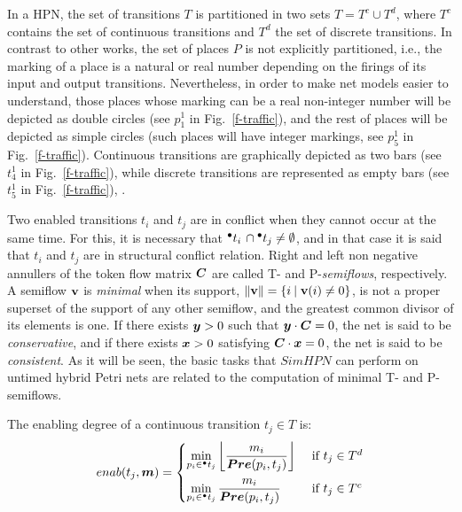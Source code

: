 In a HPN, the set of transitions $T$ is partitioned in two sets $T=T^c\cup T^d$,
where $T^c$ contains the set of continuous transitions and $T^d$ the set of discrete
transitions. In contrast to other works, the set of places $P$ is not explicitly
partitioned, i.e., the marking of a place is a natural or real number depending on the
firings of its input and output transitions. Nevertheless, in order to make net models
easier to understand, those places whose marking can be a real non-integer number
will be depicted as double circles (see $p_1^1$ in Fig.~\ref{f-traffic}), and the rest of places will be
depicted as simple circles (such places will have integer markings, see $p_5^1$ in Fig.~\ref{f-traffic}).
Continuous transitions are graphically depicted as two bars (see $t_4^1$ in Fig.~\ref{f-traffic}), while
discrete transitions are represented as empty bars (see $t_5^1$ in Fig.~\ref{f-traffic}), .

Two enabled transitions $t_i$ and $t_j$ are in conflict when they cannot
occur at the same time. For this, it is necessary that $\,\!^\bullet{t_i} \,
\cap \,\!^\bullet{t_j} \neq \emptyset$, and in that case it is said that
$t_i$ and $t_j$ are in structural conflict relation.
Right and left non negative annullers of the token flow matrix
$\b{C}$ are called T- and P-\emph{semiflows}, respectively.
A semiflow ${\mathbf{v}}$ is \emph{minimal} when its
support, $\|{{\mathbf{v}}}\|=\{i\mbox{$\: \mid \;$} {\ensuremath{\mathbf{v}}}(i)\neq 0\}$, is
not a proper superset of the support of any other semiflow, and
the greatest common divisor of its elements is one.
If there exists $\b{y}>0$ such that $\b{y} \cdot \b{C}=0$,  the net is said to be
\emph{conservative}, and if there exists $\b{x}>0$ satisfying $\b{C}\cdot\b{x}=0$,  the net
is said to be \emph{consistent}. As it will be seen, the basic tasks that
$SimHPN$ can perform on untimed hybrid Petri nets are related to the
computation of minimal T- and P-semiflows.

The enabling degree of a continuous transition $t_j \in T$ is:
\begin{equation}
\label{eq:enab}
enab(t_j,\b{m}) = \begin{cases}
 \min \limits_{p_i \in \preset{t_j}}  \left\lfloor\dfrac{m_i}{\Pre(p_i,t_j)}\right\rfloor & \text{ if $t_j \in T^d$}
  \vspace{.2cm}
\\
 \min \limits_{p_i \in \preset{t_j}} \dfrac{m_i}{\Pre(p_i,t_j)} & \text{ if $t_j \in T^c$}
\end{cases}
\end{equation}

